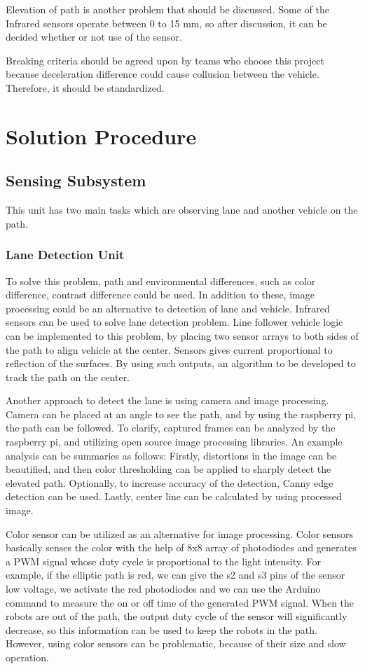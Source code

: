 \documentclass[a4paper,12pt]{article}
\begin{document}
Elevation of path is another problem that should be discussed. Some of the Infrared sensors operate between 0 to 15 mm, so after discussion, it can be decided whether or not use of the sensor. 

Breaking criteria should be agreed upon by teams who choose this project because deceleration difference could cause collusion between the vehicle. Therefore, it should be standardized.      




\section{Solution Procedure}
\subsection{Sensing Subsystem}
This unit has two main tasks which are observing lane and another vehicle on the path. 
\subsubsection{Lane Detection Unit}
To solve this problem, path and environmental differences, such as color difference, contrast difference could be used. In addition to these, image processing could be an alternative to detection of lane and vehicle. 
Infrared sensors can be used to solve lane detection problem. Line follower vehicle logic can be implemented to this problem, by placing two sensor arrays to both sides of the path to align vehicle at the center. Sensors gives current proportional to reflection of the surfaces. By using such outputs, an algorithm to be developed to track the path on the center. 

Another approach to detect the lane is using camera and image processing. Camera can be placed at an angle to see the path, and by using the raspberry pi, the path can be followed. To clarify, captured frames can be analyzed by the raspberry pi, and utilizing open source image processing libraries. An example analysis can be summaries as follows: Firstly, distortions in the image can be beautified, and then color thresholding can be applied to sharply detect the elevated path. Optionally, to increase accuracy of the detection, Canny edge detection can be used. Lastly, center line can be calculated by using processed image. 

Color sensor can be utilized as an alternative for image processing. Color sensors basically senses the color with the help of 8x8 array of photodiodes and generates a PWM signal whose duty cycle is proportional to the light intensity. For example, if the elliptic path is red, we can give the s2 and s3 pins of the sensor low voltage, we activate the red photodiodes and we can use the Arduino command to measure the on or off time of the generated PWM signal. When the robots are out of the path, the output duty cycle of the sensor will significantly decrease, so this information can be used to keep the robots in the path. However, using color sensors can be problematic, because of their size and slow operation.
\end{document}
